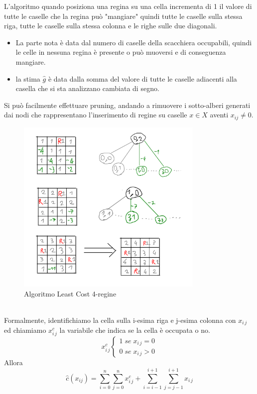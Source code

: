 \documentclass[a4paper]{article}
\begin{document}
L'algoritmo quando posiziona una regina su una cella incrementa di 1 il valore di tutte le caselle che la regina può "mangiare" quindi tutte le caselle sulla stessa riga, tutte le caselle sulla stessa colonna e le righe sulle due diagonali.
\begin{itemize}
	\item La parte nota è data dal numero di caselle della scacchiera occupabili, quindi le celle in nessuna regina è presente o può muoversi e di conseguenza mangiare.\\
	\item la stima $\hat g$ è data dalla somma del valore di tutte le caselle adiacenti alla casella che si sta analizzano cambiata di segno.
\end{itemize}
Si può facilmente effettuare pruning, andando a rimuovere i sotto-alberi generati dai nodi che rappresentano l'inserimento di regine su caselle $x \in X$ aventi $x_{ij} \neq 0$.\\
\begin{figure}[!ht]
\centering
\includegraphics[width=0.8\textwidth]{./img/4 regine.pdf}
\caption{Algoritmo Least Cost 4-regine} \label{FIG:C7}
\end{figure}\\

Formalmente, identifichiamo la cella sulla i-esima riga e j-esima colonna con $x_{i\,j}$ ed chiamiamo $x_{i\,j}^c$ la variabile che indica se la cella è occupata o no.
\begin{equation*}
	x_{i\,j}^c\begin{cases}
		1 \; se \; x_{i\,j} = 0\\
		0 \; se \; x_{i\,j} > 0
	\end{cases}
\end{equation*}
Allora
$$ \hat c(x_{ij})= \sum^n_{i=0} \sum^n_{j=0} x_{i\,j}^c + \sum_{i=i-1}^{i+1} \sum_{j=j-1}^{i+1} x_{i\,j}$$  
\end{document}
